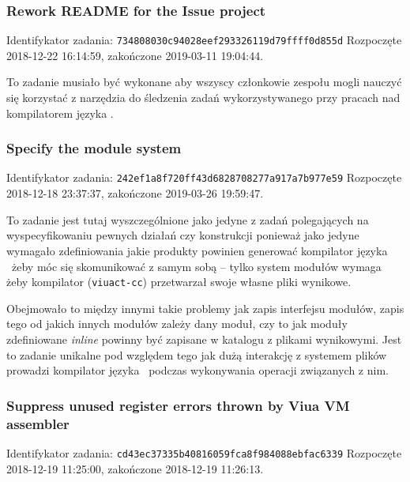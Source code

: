 \subsubsection{Rework README for the Issue project}

Identifykator zadania: \texttt{734808030c94028eef293326119d79ffff0d855d}
\newline
Rozpoczęte 2018-12-22 16:14:59, zakończone 2019-03-11 19:04:44.
\newline

To zadanie musiało być wykonane aby wszyscy członkowie zespołu mogli nauczyć się
korzystać z narzędzia do śledzenia zadań wykorzystywanego przy pracach nad
kompilatorem języka \ViuAct.

\subsubsection{Specify the module system}

Identifykator zadania: \texttt{242ef1a8f720ff43d6828708277a917a7b977e59}
\newline
Rozpoczęte 2018-12-18 23:37:37, zakończone 2019-03-26 19:59:47.
\newline

To zadanie jest tutaj wyszczególnione jako jedyne z zadań polegających na
wyspecyfikowaniu pewnych działań czy konstrukcji ponieważ jako jedyne wymagało
zdefiniowania jakie produkty powinien generować kompilator języka \ViuAct\ żeby
móc się skomunikować z samym sobą -- tylko system modułów wymaga żeby kompilator
(\texttt{viuact-cc}) przetwarzał swoje własne pliki wynikowe.

Obejmowało to między innymi takie problemy jak zapis interfejsu modułów, zapis
tego od jakich innych modułów zależy dany moduł, czy to jak moduły zdefiniowane
\emph{inline} powinny być zapisane w katalogu z plikami wynikowymi. Jest to
zadanie unikalne pod względem tego jak dużą interakcję z systemem plików
prowadzi kompilator języka \ViuAct\ podczas wykonywania operacji związanych z
nim.

\subsubsection{Suppress unused register errors thrown by Viua VM assembler}

Identifykator zadania: \texttt{cd43ec37335b40816059fca8f984088ebfac6339}
\newline
Rozpoczęte 2018-12-19 11:25:00, zakończone 2018-12-19 11:26:13.
\newline

